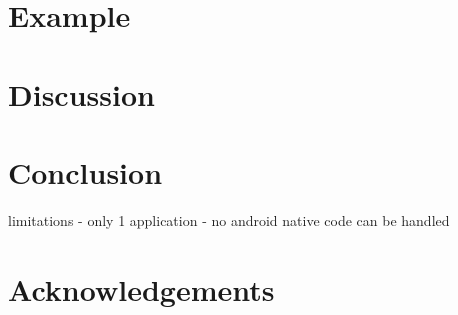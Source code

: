 \documentclass{acm_proc_article-sp}
\begin{document}
\section{Example}





\section{Discussion}




\section{Conclusion}


limitations
- only 1 application
- no android native code can be handled



\section{Acknowledgements}

%

% 
\end{document}
